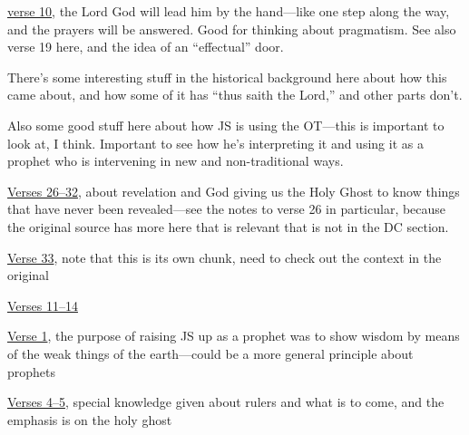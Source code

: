 \begin{compactdesc}
				\begin{compactitem}
					\item \hyperref[DC112-10]{verse 10}, the Lord God will lead him by the hand---like one step along the way, and the prayers will be answered. Good for thinking about pragmatism. See also verse 19 here, and the idea of an ``effectual'' door.
				\end{compactitem}
			\item[{\hyperref[DC113]{DC 113}}]
				\begin{compactitem}
					\item There's some interesting stuff in the historical background here about how this came about, and how some of it has ``thus saith the Lord,'' and other parts don't.
					\item Also some good stuff here about how JS is using the OT---this is important to look at, I think. Important to see how he's interpreting it and using it as a prophet who is intervening in new and non-traditional ways.
				\end{compactitem}
			\item[{\hyperref[DC121]{DC 121}}]
				\begin{compactitem}
					\item \hyperref[DC121-26]{Verses 26--32}, about revelation and God giving us the Holy Ghost to know things that have never been revealed---see the notes to verse 26 in particular, because the original source has more here that is relevant that is not in the DC section.
					\item \hyperref[DC121-33]{Verse 33}, note that this is its own chunk, need to check out the context in the original
				\end{compactitem}
			\item[{\hyperref[DC123]{DC 123}}]
				\begin{compactitem}
					\item \hyperref[DC123-11]{Verses 11--14}
				\end{compactitem}
			\item[{\hyperref[DC124]{DC 124}}]
				\begin{compactitem}
					\item \hyperref[DC124-1]{Verse 1}, the purpose of raising JS up as a prophet was to show wisdom by means of the weak things of the earth---could be a more general principle about prophets
					\item \hyperref[DC124-4]{Verses 4--5}, special knowledge given about rulers and what is to come, and the emphasis is on the holy ghost

\end{compactitem}
\end{compactdesc}
